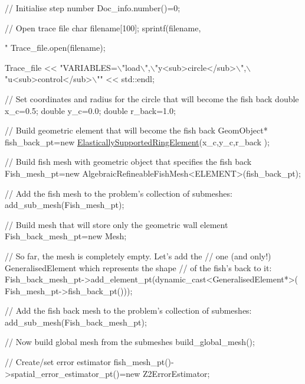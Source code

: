 \begin{DoxyCodeInclude}
 \textcolor{comment}{// Initialise step number}
 Doc\_info.number()=0;
 
 \textcolor{comment}{// Open trace file}
 \textcolor{keywordtype}{char} filename[100];
 sprintf(filename,\textcolor{stringliteral}{"%
 Trace\_file.open(filename);

 Trace\_file 
  << \textcolor{stringliteral}{"VARIABLES=\(\backslash\)"load\(\backslash\)",\(\backslash\)"y<sub>circle</sub>\(\backslash\)",\(\backslash\)"u<sub>control</sub>\(\backslash\)""}
  << std::endl;

 \textcolor{comment}{// Set coordinates and radius for the circle that will become the fish back}
 \textcolor{keywordtype}{double} x\_c=0.5;
 \textcolor{keywordtype}{double} y\_c=0.0;
 \textcolor{keywordtype}{double} r\_back=1.0;

 \textcolor{comment}{// Build geometric element that will become the fish back}
 GeomObject* fish\_back\_pt=\textcolor{keyword}{new} \hyperlink{classoomph_1_1ElasticallySupportedRingElement}{ElasticallySupportedRingElement}(x\_c,y\_c,r\_back
      );

 \textcolor{comment}{// Build fish mesh with geometric object that specifies the fish back }
 Fish\_mesh\_pt=\textcolor{keyword}{new} AlgebraicRefineableFishMesh<ELEMENT>(fish\_back\_pt);

 \textcolor{comment}{// Add the fish mesh to the problem's collection of submeshes:}
 add\_sub\_mesh(Fish\_mesh\_pt);

 \textcolor{comment}{// Build mesh that will store only the geometric wall element}
 Fish\_back\_mesh\_pt=\textcolor{keyword}{new} Mesh;

 \textcolor{comment}{// So far, the mesh is completely empty. Let's add the }
 \textcolor{comment}{// one (and only!) GeneralisedElement which represents the shape}
 \textcolor{comment}{// of the fish's back to it:}
 Fish\_back\_mesh\_pt->add\_element\_pt(dynamic\_cast<GeneralisedElement*>(
                                    Fish\_mesh\_pt->fish\_back\_pt()));

 \textcolor{comment}{// Add the fish back mesh to the problem's collection of submeshes:}
 add\_sub\_mesh(Fish\_back\_mesh\_pt);

 \textcolor{comment}{// Now build global mesh from the submeshes}
 build\_global\_mesh();

 
 \textcolor{comment}{// Create/set error estimator}
 fish\_mesh\_pt()->spatial\_error\_estimator\_pt()=\textcolor{keyword}{new} Z2ErrorEstimator;
  
}
\end{DoxyCodeInclude}
